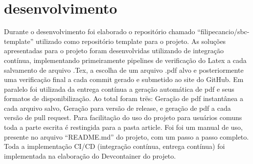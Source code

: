 \section{desenvolvimento}

Durante o desenvolvimento foi elaborado o repositório chamado ``filipecancio/sbc-template'' utilizado como repositório template para o projeto. As soluções apresentadas para o projeto foram desenvolvidas utilizando de integração contínua, implementando primeiramente pipelines de verificação do Latex a cada salvamento de arquivo .Tex, a escolha de um arquivo .pdf alvo e posteriormente uma verificação final a cada commit gerado e submetido ao site do GitHub. Em paralelo foi utilizada da entrega contínua a geração automática de pdf e seus formatos de disponibilização. Ao total foram trës: Geração de pdf instantânea a cada arquivo salvo, Geração para versão de release, e geração de pdf a cada versão de pull request.
Para facilitação do uso do projeto para usuários comuns toda a parte escrita é restingida para a pasta article. Foi foi um manual de uso, presente no arquivo ``README.md'' do projeto, com um passo a passo completo.
Toda a implementação CI/CD (integração contínua, entrega contínua) foi implementada na elaboração do Devcontainer do projeto.